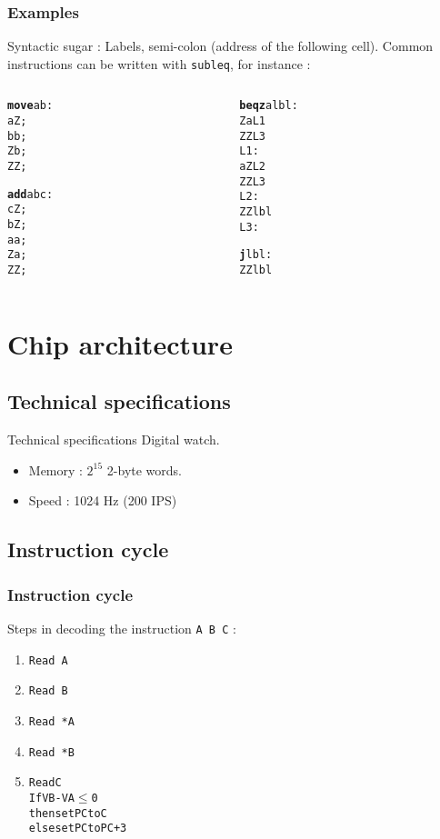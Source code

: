 \documentclass{beamer}
\begin{document}
\begin{frame}[fragile]
    \frametitle{Examples}
Syntactic sugar : Labels, semi-colon (address of the following cell).
Common instructions can be written with \texttt{subleq}, for instance :

\begin{columns}[t]
  \begin{column}[T]{3cm}
    \begin{alltt}
{\bf move} a b :
   a Z ;
   b b ;
   Z b ;
   Z Z ;

{\bf add} a b c :
   c Z ;
   b Z ;
   a a ;
   Z a ;
   Z Z ;
    \end{alltt}
  \end{column}
  \begin{column}[T]{3cm}
    \begin{alltt}
{\bf beqz} a lbl :
    Z a L1
    Z Z L3
 L1:
    a Z L2
    Z Z L3
 L2:
    Z Z lbl
 L3:

{\bf j} lbl :
    Z Z lbl
    \end{alltt}
  \end{column}
  \end{columns}
\end{frame}


\section{Chip architecture}
\subsection{Technical specifications}

\begin{frame}{Technical specifications}
  Digital watch.
  \begin{itemize}
    \item Memory : $2^{15}$ 2-byte words.
    \item Speed : 1024 Hz (200 IPS)
  \end{itemize}
\end{frame}

\subsection{Instruction cycle}

\begin{frame}[fragile]
  \frametitle{Instruction cycle}
  Steps in decoding the instruction \verb=A B C= :
      \begin{enumerate}
        \item<2-> \verb=Read A=
        \item<3-> \verb=Read B=
        \item<4-> \verb=Read *A=
        \item<5-> \verb=Read *B=
        \item<6->
          \begin{alltt}
Read C
If VB - VA \(\leq\) 0
  then set PC to C
else set PC to PC+3
          \end{alltt}
      \end{enumerate}
\end{frame}
\end{document}
